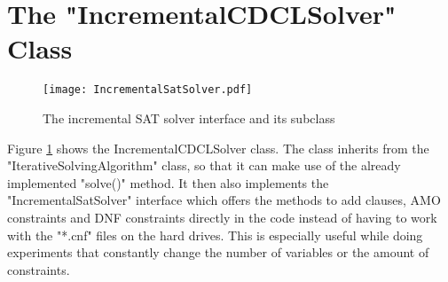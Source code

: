 \section{The "IncrementalCDCLSolver" Class}

\begin{figure}[htbp]
  \centering
  \texttt{[image: IncrementalSatSolver.pdf]}
  \caption{The incremental SAT solver interface and its subclass}
  \label{fig:incrementalSAT}
\end{figure}

Figure \ref{fig:incrementalSAT} shows the IncrementalCDCLSolver class. The class inherits from the "IterativeSolvingAlgorithm" class, so that it can make use of the already implemented "solve()" method. It then also implements the "IncrementalSatSolver" interface which offers the methods to add clauses, AMO constraints and DNF constraints directly in the code instead of having to work with the "*.cnf" files on the hard drives. This is especially useful while doing experiments that constantly change the number of variables or the amount of constraints.
